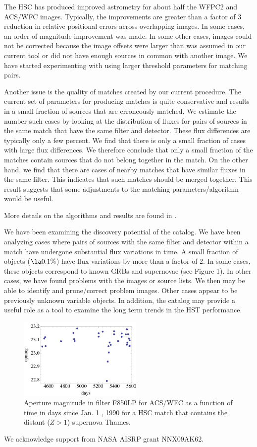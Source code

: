 The HSC has produced improved astrometry for about half the WFPC2 and ACS/WFC images. Typically, the improvements are greater than a factor of 3 reduction in relative positional errors across overlapping images. In some cases, an order of magnitude improvement was made. In some other cases, images could not be corrected because the image offsets were larger than was assumed in our current tool or did not have enough sources in common  with another image. We have started experimenting with using larger threshold parameters for matching pairs.

Another issue is the quality of matches created by our current procedure. The current set of parameters for producing matches is quite conservative and results in a small fraction of sources that are erroneously matched. We estimate the number such cases by looking at the distribution of fluxes for pairs of sources in the same match that have the same filter and detector. These flux differences are typically only a few percent. We find that there is only a small fraction of cases with large flux differences.  We therefore conclude that only a small fraction of the matches contain sources that do not belong together in the match. On the other hand, we find that there are cases of nearby matches that have similar fluxes in the same filter. This indicates that such matches should be merged together. This result suggests that some adjustments to the matching parameters/algorithm would be useful.

More details on the algorithms and results are found in \cite{2012arXiv1206.0644B}.

We have been examining the discovery potential of the catalog. We have been analyzing cases where pairs of sources with the same filter and detector within a match have undergone substantial flux variations in time. A small fraction of objects ($\la 0.1 \%$) have flux variations by more than a factor of 2. In some cases, these    objects correspond to known GRBs and supernovae (see Figure 1).  In other cases, we have found problems with the images or source lists. We then may be able to identify and prune/correct problem images. Other cases appear to be previously unknown variable objects. In addition, the catalog may provide a useful role as a tool to examine the long term trends in the HST performance.


\begin{figure}
\centering
\includegraphics[width=6.0cm]{part8/Lubow_O21/O21_1.eps}
\caption{Aperture magnitude in filter F850LP for ACS/WFC as a function of time in days since Jan. 1 , 1990 for a HSC match that contains the distant ($Z> 1$) supernova Thames.}
\end{figure}


\acknowledgements We acknowledge support from NASA AISRP grant NNX09AK62.


